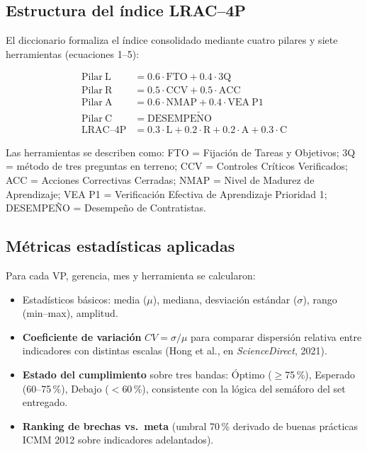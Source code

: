 \documentclass[12pt,a4paper]{article}
\begin{document}
\subsection{Estructura del índice LRAC--4P}
El diccionario formaliza el índice consolidado mediante cuatro pilares y siete herramientas (ecuaciones 1--5):

\begin{align}
\mathrm{Pilar~L} &= 0.6\cdot\mathrm{FTO} + 0.4\cdot 3\mathrm{Q} \\
\mathrm{Pilar~R} &= 0.5\cdot\mathrm{CCV} + 0.5\cdot\mathrm{ACC} \\
\mathrm{Pilar~A} &= 0.6\cdot\mathrm{NMAP} + 0.4\cdot\mathrm{VEA~P1} \\
\mathrm{Pilar~C} &= \mathrm{DESEMPE\tilde NO} \\
\mathrm{LRAC\text{--}4P} &= 0.3\cdot\mathrm{L} + 0.2\cdot\mathrm{R} + 0.2\cdot\mathrm{A} + 0.3\cdot\mathrm{C}
\end{align}

Las herramientas se describen como: FTO = Fijación de Tareas y Objetivos; 3Q = método de tres preguntas en terreno; CCV = Controles Críticos Verificados; ACC = Acciones Correctivas Cerradas; NMAP = Nivel de Madurez de Aprendizaje; VEA P1 = Verificación Efectiva de Aprendizaje Prioridad 1; DESEMPEÑO = Desempeño de Contratistas.

\subsection{Métricas estadísticas aplicadas}
Para cada VP, gerencia, mes y herramienta se calcularon:
\begin{itemize}
\item Estadísticos básicos: media ($\mu$), mediana, desviación estándar ($\sigma$), rango (min--max), amplitud.
\item \textbf{Coeficiente de variación} $CV=\sigma/\mu$ para comparar dispersión relativa entre indicadores con distintas escalas (Hong et al., en \emph{ScienceDirect}, 2021).
\item \textbf{Estado del cumplimiento} sobre tres bandas: Óptimo ($\geq$75\,\%), Esperado (60--75\,\%), Debajo ($<$60\,\%), consistente con la lógica del semáforo del set entregado.
\item \textbf{Ranking de brechas vs.\ meta} (umbral 70\,\% derivado de buenas prácticas ICMM 2012 sobre indicadores adelantados).
\end{itemize}
\end{document}
